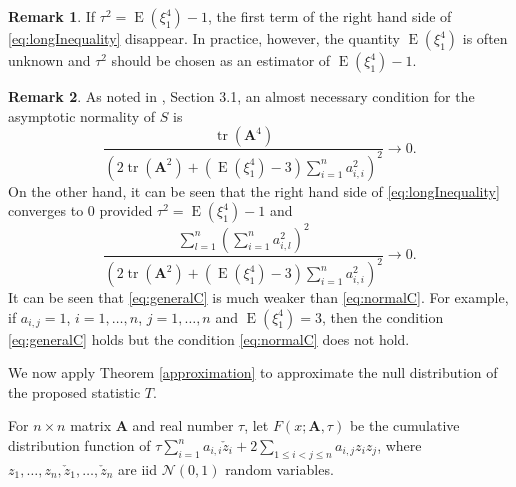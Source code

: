 \documentclass[11pt]{article}
\DeclareMathOperator{\mytr}{tr}
\DeclareMathOperator{\myE}{E}
\newcommand{\BA}{\mathbf{A}}    \newcommand{\BB}{\mathbf{B}}    \newcommand{\BC}{\mathbf{C}}    \newcommand{\BD}{\mathbf{D}}    \newcommand{\BE}{\mathbf{E}}    \newcommand{\BF}{\mathbf{F}}    \newcommand{\BG}{\mathbf{G}}    \newcommand{\BH}{\mathbf{H}}    \newcommand{\BI}{\mathbf{I}}    \newcommand{\BJ}{\mathbf{J}}    \newcommand{\BK}{\mathbf{K}}    \newcommand{\BL}{\mathbf{L}}
\theoremstyle{plain}
\theoremstyle{definition}
\newtheorem{remark}{\quad\quad Remark}
\theoremstyle{remark}
\begin{document}
\begin{remark}\label{remark1}
    If $\tau^2=\myE (\xi_1^4) -1$, the first term of the right hand side of \eqref{eq:longInequality} disappear.
    In practice, however, the quantity $\myE (\xi_1^4)$ is often unknown and
    $\tau^2$ should be chosen as an estimator of $\myE (\xi_1^4)-1$.
\end{remark}

\begin{remark}
    As noted in \cite{Chatterjee2008}, Section 3.1, an almost necessary condition for the asymptotic normality of $S$ is
    \begin{equation}\label{eq:normalC}
        \frac{\mytr (\BA^4)}{
            \left( 
        2 \mytr(\BA^2)
    +
    (\myE (\xi_1^4)-3)\sum_{i=1}^n a_{i,i}^2
            \right)^2
        }\to 0. 
    \end{equation}
    On the other hand, it can be seen that the right hand side of \eqref{eq:longInequality} converges to $0$ provided $\tau^2=\myE (\xi_1^4)-1$ and
    \begin{equation}\label{eq:generalC}
            \frac{
                \sum_{l=1}^n \left( \sum_{i=1}^n a_{i,l}^2 \right)^2
            }{
            \left(
        2 \mytr(\BA^2)
    +
    (\myE (\xi_1^4)-3)\sum_{i=1}^n a_{i,i}^2
\right)^{2}
            }
            \to 0.
    \end{equation}
    It can be seen that \eqref{eq:generalC} is much weaker than \eqref{eq:normalC}.
    For example, if $a_{i,j}=1$, $i=1,\ldots, n$, $j=1,\ldots, n$ and $\myE (\xi_1^4)=3$, then the condition \eqref{eq:generalC} holds but the condition \eqref{eq:normalC} does not hold.
\end{remark}


We now apply Theorem \ref{approximation} to approximate the null distribution of the proposed statistic $T$.


For $n\times n$ matrix $\BA$ and real number $\tau$, let $F (x;{\BA,\tau})$ be the cumulative distribution function of $
        \tau \sum_{i=1}^n  a_{i,i}\check z_i
    +2\sum_{1\leq i <j \leq n} a_{i,j} z_i z_j
    $,
    where $z_1,\ldots, z_n, \check z_1, \ldots, \check z_n$ are iid  $\mathcal N(0,1)$ random variables.
\end{document}

